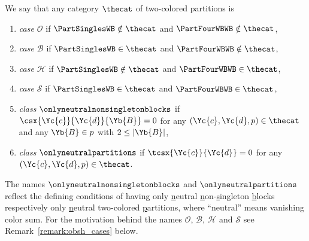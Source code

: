 \documentclass[pdftex]{sigma}
\numberwithin{equation}{section}
\begin{document}
\begin{Definition}
  \label{definition:obsh_cases}
  \newcommand{\incol}{\Yc{c}}
  \newcommand{\outcol}{\Yc{d}}
  \newcommand{\thepartition}{p}
  \newcommand{\anyblock}{\Yb{B}}
  We say that any category  $\thecat$  of two-co\-lo\-red partitions is
  \begin{enumerate}
  \item \emph{case $\mathcal{O}$} if $\PartSinglesWB\notin\thecat$ and $\PartFourWBWB\notin\thecat$,
  \item \emph{case $\mathcal{B}$}  if $\PartSinglesWB\in\thecat$ and $\PartFourWBWB\notin\thecat$,
  \item \emph{case $\mathcal{H}$}  if $\PartSinglesWB\notin\thecat$ and $\PartFourWBWB\in\thecat$,
  \item \emph{case $\mathcal{S}$}     if $\PartSinglesWB\in\thecat$ and $\PartFourWBWB \in\thecat$,
  \item \emph{class $\onlyneutralnonsingletonblocks$}
    if $\csx{\incol}{\outcol}{\anyblock}=0$ for any $(\incol,\outcol,\thepartition)\in\thecat$ and any $\anyblock\in\thepartition$ with $2\leq |\anyblock|$,
  \item \emph{class $\onlyneutralpartitions$}
    if $\tcsx{\incol}{\outcol}=0$ for any $(\incol,\outcol,\thepartition)\in\thecat$.
  \end{enumerate}
\end{Definition}
The names $\onlyneutralnonsingletonblocks$ and $\onlyneutralpartitions$ reflect the defining conditions  of having only \underline{n}eutral \underline{n}on-\underline{s}ingleton \underline{b}locks respectively only \underline{n}eutral two-colored \underline{p}artitions, where ``neutral'' means vanishing color sum.
For the motivation behind the names $\mathcal{O}$, $\mathcal{B}$, $\mathcal{H}$ and $\mathcal{S}$ see Remark~\ref{remark:obsh_cases} below.
\end{document}
